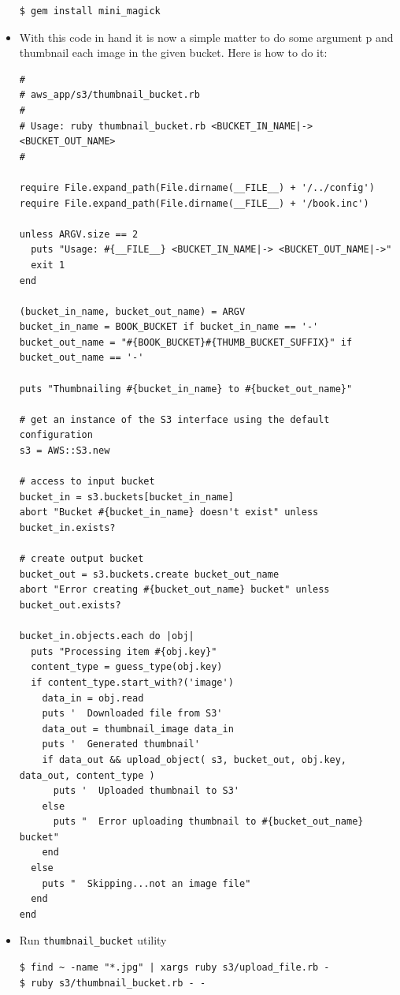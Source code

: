 \documentclass{beamer}
\begin{document}
\begin{frame}
\begin{itemize}
\lstset{language=shell}
\begin{lstlisting}[escapechar=!]
$ gem install mini_magick
\end{lstlisting}


\item With this code in hand it is now a simple matter to do some argument p
and thumbnail each image in the given bucket. Here is how to do it:
\lstset{language=Ruby, style=eclipse}
\begin{lstlisting}[escapechar=!]
#
# aws_app/s3/thumbnail_bucket.rb
#
# Usage: ruby thumbnail_bucket.rb <BUCKET_IN_NAME|-> <BUCKET_OUT_NAME>
#

require File.expand_path(File.dirname(__FILE__) + '/../config')
require File.expand_path(File.dirname(__FILE__) + '/book.inc')

unless ARGV.size == 2
  puts "Usage: #{__FILE__} <BUCKET_IN_NAME|-> <BUCKET_OUT_NAME|->"
  exit 1
end

(bucket_in_name, bucket_out_name) = ARGV
bucket_in_name = BOOK_BUCKET if bucket_in_name == '-'
bucket_out_name = "#{BOOK_BUCKET}#{THUMB_BUCKET_SUFFIX}" if bucket_out_name == '-'

puts "Thumbnailing #{bucket_in_name} to #{bucket_out_name}"

# get an instance of the S3 interface using the default configuration
s3 = AWS::S3.new

# access to input bucket
bucket_in = s3.buckets[bucket_in_name]
abort "Bucket #{bucket_in_name} doesn't exist" unless bucket_in.exists?

# create output bucket
bucket_out = s3.buckets.create bucket_out_name
abort "Error creating #{bucket_out_name} bucket" unless bucket_out.exists?

bucket_in.objects.each do |obj|
  puts "Processing item #{obj.key}"
  content_type = guess_type(obj.key)
  if content_type.start_with?('image')
    data_in = obj.read
    puts '  Downloaded file from S3'
    data_out = thumbnail_image data_in
    puts '  Generated thumbnail'
    if data_out && upload_object( s3, bucket_out, obj.key, data_out, content_type )
      puts '  Uploaded thumbnail to S3'
    else
      puts "  Error uploading thumbnail to #{bucket_out_name} bucket"
    end
  else
    puts "  Skipping...not an image file"
  end
end
\end{lstlisting}

\item Run \texttt{thumbnail\_bucket} utility
\lstset{language=shell}
\begin{lstlisting}[escapechar=!]
$ find ~ -name "*.jpg" | xargs ruby s3/upload_file.rb -
$ ruby s3/thumbnail_bucket.rb - -
\end{lstlisting}

\end{itemize}
\end{frame}
\end{document}
